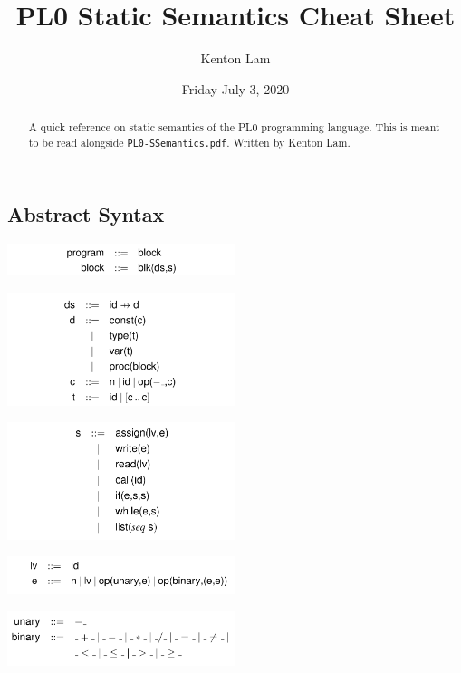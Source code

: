 \documentclass[10pt,a4paper,]{article}
\title{PL0 Static Semantics Cheat Sheet}
\author{Kenton Lam}
\date{Friday July 3, 2020}
\begin{document}
\maketitle

\begin{abstract}
  A quick reference on static semantics of the PL0 programming language.
This is meant to be read alongside \texttt{PL0-SSemantics.pdf}. Written
by Kenton Lam.
\end{abstract}

\hypertarget{abstract-syntax}{%
\subsection{Abstract Syntax}\label{abstract-syntax}}

\includegraphics[width=0.5\textwidth]{assets/image-20200703170905035.png}

\includegraphics[width=0.5\textwidth]{assets/image-20200703170927076.png}

\includegraphics[width=0.5\textwidth]{assets/image-20200703170959717.png}

\includegraphics[width=0.5\textwidth]{assets/image-20200703171012542.png}

\includegraphics[width=0.5\textwidth]{assets/image-20200703171023633.png}
\end{document}
